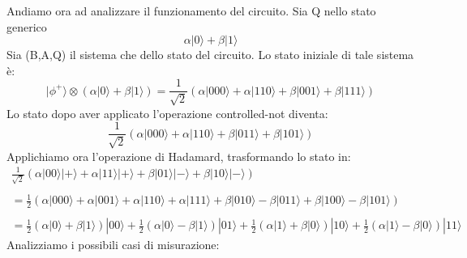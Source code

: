 Andiamo ora ad analizzare il funzionamento del circuito. Sia Q nello stato generico 
\begin{equation*}
    \alpha |0\rangle + \beta |1\rangle
\end{equation*}
Sia (B,A,Q) il sistema che dello stato del circuito. Lo stato iniziale di tale sistema è:
\begin{equation*}
    |\phi^+\rangle \otimes \left(\alpha |0\rangle + \beta |1\rangle\right) = \frac{1}{\sqrt{2}} \left(\alpha|000\rangle + \alpha|110\rangle + \beta|001\rangle + \beta|111\rangle\right)
\end{equation*}
Lo stato dopo aver applicato l'operazione controlled-not diventa:
\begin{equation*}
    \frac{1}{\sqrt{2}} \left(\alpha|000\rangle + \alpha|110\rangle + \beta|011\rangle + \beta|101\rangle\right)
\end{equation*}
Applichiamo ora l'operazione di Hadamard, trasformando lo stato in:
\begin{equation*}
    \begin{array}{c}
        \frac{1}{\sqrt{2}} \left(\alpha|00\rangle|+\rangle + \alpha|11\rangle|+\rangle + \beta|01\rangle|-\rangle + \beta|10\rangle|-\rangle\right) \\ \\ 
        = \frac{1}{2} \left(\alpha|000\rangle + \alpha|001\rangle + \alpha|110\rangle +  \alpha|111\rangle + \beta|010\rangle - \beta|011\rangle + \beta|100\rangle - \beta|101\rangle\right) \\ \\
        = \frac{1}{2}\left(\alpha |0\rangle + \beta |1\rangle\right)|00\rangle + \frac{1}{2}\left(\alpha |0\rangle - \beta |1\rangle\right)|01\rangle + \frac{1}{2}\left(\alpha |1\rangle + \beta |0\rangle\right)|10\rangle + \frac{1}{2}\left(\alpha |1\rangle - \beta |0\rangle\right)|11\rangle 
    \end{array}
\end{equation*}
Analizziamo i possibili casi di misurazione:
